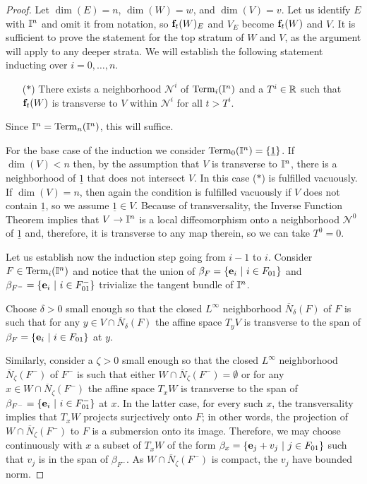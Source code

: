 \begin{proof}
	Let $\dim(E) = n$, $\dim(W) = w$, and $\dim(V) = v$.
	Let us identify $E$ with $\mathbb{I}^n$ and omit it from notation, so $\mathbf{f}_t(W)_E$ and $V_E$ become $\mathbf{f}_t(W)$ and $V$.
	It is sufficient to prove the statement for the top stratum of $W$ and $V$, as the argument will apply to any deeper strata.
	We will establish the following statement inducting over $i = 0, \dots, n$.
	\begin{itemize}
		\item[($\ast$)] There exists a neighborhood $\mathcal N^i$ of ${\rm Term}_{i}(\mathbb{I}^n)$ and a $T^i \in \mathbb{R}$ such that $\mathbf{f}_t(W)$ is transverse to $V$ within $\mathcal N^i$ for all $t > T^i$.
	\end{itemize}
	Since $\mathbb{I}^n = {\rm Term}_{n}(\mathbb{I}^n)$, this will suffice.

	For the base case of the induction we consider ${\rm Term}_0(\mathbb{I}^n) = \{\underline{1}\}$.
	If $\dim(V) < n$ then, by the assumption that $V$ is transverse to $\mathbb{I}^n$, there is a neighborhood of $\underline{1}$ that does not intersect $V$.
	In this case ($\ast$) is fulfilled vacuously.
	If $\dim(V) = n$, then again the condition is fulfilled vacuously if $V$ does not contain $\underline{1}$, so we assume $\underline{1} \in V$.
	Because of transversality, the Inverse Function Theorem implies that $V \to \mathbb{I}^n$ is a local diffeomorphism onto a neighborhood $\mathcal N^0$ of $\underline{1}$ and, therefore, it is transverse to any map therein, so we can take $T^0 = 0$.

	Let us establish now the induction step going from $i-1$ to $i$.
	Consider $F \in {\rm Term}_{i}(\mathbb{I}^n)$ and notice that the union of $\beta_F = \{\mathbf{e}_i\ |\ i \in F_{01}\}$ and $\beta_{F^-} = \{\mathbf{e}_i\ |\ i \in F^-_{01}\}$ trivialize the tangent bundle of $\mathbb{I}^n$.

	Choose $\delta > 0$ small enough so that the closed $L^\infty$ neighborhood $\overline N_\delta(F)$ of $F$ is such that for any $y \in V \cap \overline N_\delta(F)$ the affine space $T_yV$ is transverse to the span of $\beta_F = \{\mathbf{e}_i\ |\ i \in F_{01}\}$ at $y$.

	Similarly, consider a $\zeta > 0$ small enough so that the closed $L^\infty$ neighborhood $\overline N_\zeta(F^-)$ of $F^-$ is such that either $W \cap \overline N_\zeta(F^-) = \emptyset$ or for any $x \in W \cap \overline N_\zeta(F^-)$ the affine space $T_xW$ is transverse to the span of $\beta_{F^-} = \{\mathbf{e}_i\ |\ i \in F^-_{01}\}$ at $x$.
	In the latter case, for every such $x$, the transversality implies that $T_xW$ projects surjectively onto $F$; in other words, the projection of $W \cap \overline N_\zeta(F^-)$ to $F$ is a submersion onto its image.
	Therefore, we may choose continuously with $x$ a subset of $T_xW$ of the form $\beta_x = \{\mathbf{e}_j + v_j\ |\ j \in F_{01}\}$ such that $v_j$ is in the span of $\beta_{F^-}$.
	As $W \cap \overline N_\zeta(F^-)$ is compact, the $v_j$ have bounded norm.


\end{proof}
